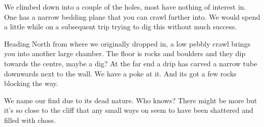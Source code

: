 We climbed down into a couple of the holes, most have nothing of interest in. One has a narrow bedding plane that you can crawl further into. We would spend a little while on a subsequent trip trying to dig this without much success. 
 
Heading North from where we originally dropped in, a low pebbly crawl brings you into another large chamber. The floor is rocks and boulders and they dip towards the centre, maybe a dig? At the far end a drip has carved a narrow tube downwards next to the wall. We have a poke at it. And its got a few rocks blocking the way.
 
We name our find  due to its dead nature. Who knows? There might be more but it's so close to the cliff that any small ways on seem to have been shattered and filled with choss.

